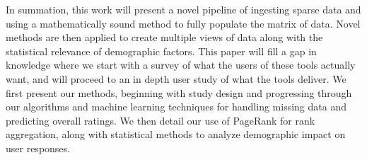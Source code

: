 In summation, this work will present a novel pipeline of ingesting sparse data and using a mathematically sound method to fully populate the matrix of data. Novel methods are then applied to create multiple views of data along with the statistical relevance of demographic factors. This paper will fill a gap in knowledge where we start with a survey of what the users of these tools actually want, and will proceed to an in depth user study of what the tools deliver. We first present our methods, beginning with study design and progressing through our algorithms and machine learning techniques for handling missing data and predicting overall ratings. We then detail our use of PageRank for rank aggregation, along with statistical methods to analyze demographic impact on user responses. 
